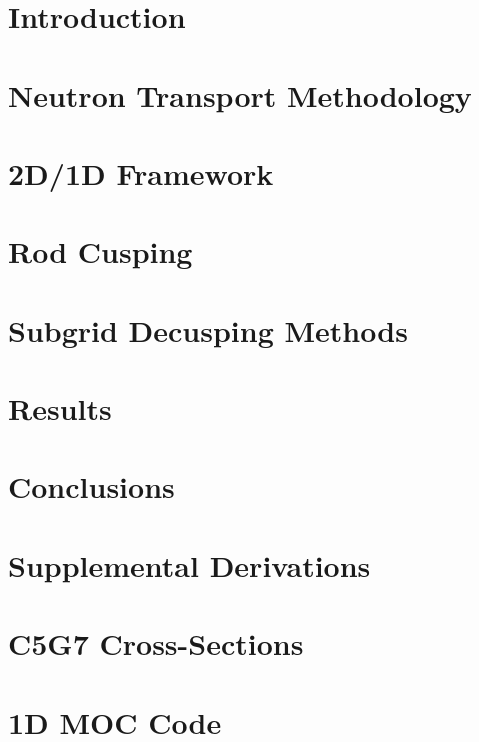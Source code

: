 \documentclass[12pt]{thesis-umich}
\newcommand{\?}{\stackrel{?}{=}}
\begin{document}

\chapter{Introduction}\label{chap:intro}


\chapter{Neutron Transport Methodology}\label{chap:transport}


\chapter{2D/1D Framework}\label{chap:2d1d}


\chapter{Rod Cusping}\label{chap:cusping}


\chapter{Subgrid Decusping Methods}\label{chap:results}


\chapter{Results}\label{chap:proposed}

 
\chapter{Conclusions}\label{chap:concl}


\appendix
\chapter{Supplemental Derivations}\label{app:derivations}


\chapter{C5G7 Cross-Sections}\label{app:c5g7xs}


\chapter{1D MOC Code}\label{app:1dmoc-code}




\end{document}
